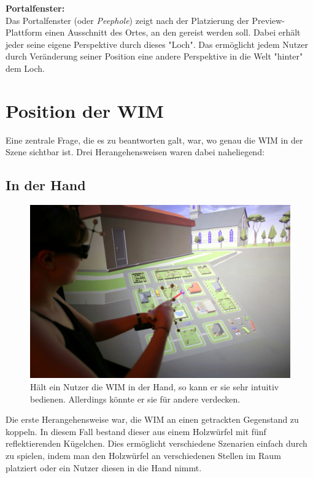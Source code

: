 \textbf{Portalfenster:}\\
Das Portalfenster (oder \textit{Peephole}) zeigt nach der Platzierung der Preview-Plattform einen Ausschnitt des Ortes, an den gereist werden soll. Dabei erhält jeder seine eigene Perspektive durch dieses "Loch". Das ermöglicht jedem Nutzer durch Veränderung seiner Position eine andere Perspektive in die Welt "hinter" dem Loch.

\section{Position der WIM}
Eine zentrale Frage, die es zu beantworten galt, war, wo genau die WIM in der Szene sichtbar ist. Drei Herangehensweisen waren dabei naheliegend:

\subsection{In der Hand}

\begin{figure}[h!]
  \centering
  \includegraphics[width=\textwidth]{images/wim_in_hand.JPG}
  \caption{Hält ein Nutzer die WIM in der Hand, so kann er sie sehr intuitiv bedienen. Allerdings könnte er sie für andere verdecken.}
  \label{fig:todo}
\end{figure}

Die erste Herangehensweise war, die WIM an einen getrackten Gegenstand zu koppeln. In diesem Fall bestand dieser aus einem Holzwürfel mit fünf reflektierenden Kügelchen.
Dies ermöglicht verschiedene Szenarien einfach durch zu spielen, indem man den Holzwürfel an verschiedenen Stellen im Raum platziert oder ein Nutzer diesen in die Hand nimmt.


